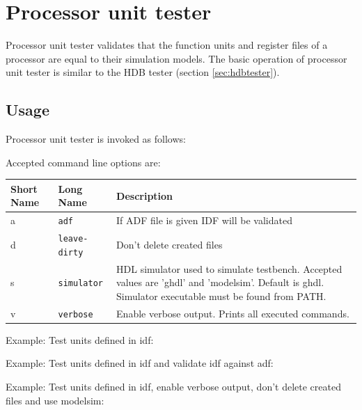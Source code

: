 \documentclass[a4paper,twoside]{tceusermanual}
\begin{document}
\section{Processor unit tester}

Processor unit tester validates that the function units and register files of
a processor are equal to their simulation models. The basic operation of processor
unit tester is similar to the HDB tester (section \ref{sec:hdbtester}).

\subsection{Usage}

Processor unit tester is invoked as follows:


Accepted command line options are:

\begin{center}
\begin{longtable}[htb]{@{}p{}@{}p{}%
                     @{}p{}}

\textbf{Short Name} &\textbf{Long Name} &\textbf{Description} \\
\hline

a & \verb|adf| &
If ADF file is given IDF will be validated \\

d & \verb|leave-dirty| &
Don't delete created files \\

s & \verb|simulator| &
HDL simulator used to simulate testbench. Accepted values are 'ghdl' and
'modelsim'. Default is ghdl. Simulator executable must be found from PATH. \\

v & \verb|verbose| &
Enable verbose output. Prints all executed commands. \\

\end{longtable}
\end{center}

Example: Test units defined in idf:


Example: Test units defined in idf and validate idf against adf:


Example: Test units defined in idf, enable verbose output, don't delete created
files and use modelsim:
\end{document}
